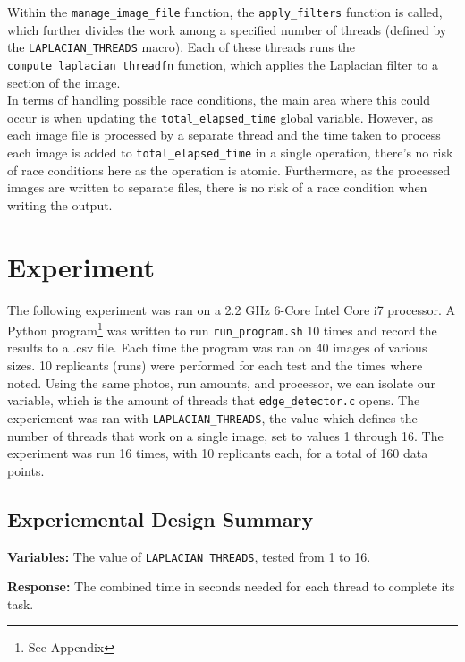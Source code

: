 \documentclass{article}
\begin{document}
Within the \texttt{manage\_image\_file} function,
the \texttt{apply\_filters} function is called,
which further divides the work among a specified number of threads
(defined by the \texttt{LAPLACIAN\_THREADS} macro).
Each of these threads runs the \texttt{compute\_laplacian\_threadfn} function,
which applies the Laplacian filter to a section of the image.\\

In terms of handling possible race conditions,
the main area where this could occur is when updating the \texttt{total\_elapsed\_time}
global variable. However, as each image file is processed
by a separate thread and the time taken to process each image is
added to \texttt{total\_elapsed\_time} in a single operation, there's no risk of
race conditions here as the operation is atomic.
Furthermore, as the processed images are written to separate files,
there is no risk of a race condition when writing the output.\\

\section*{Experiment}
The following experiment was ran on a 2.2 GHz 6-Core Intel Core i7 processor.
A Python program\footnote{See Appendix} was written to run \texttt{run\_program.sh} 10 times and record the results to a .csv file.
Each time the program was ran on 40 images of various sizes.
10 replicants (runs) were performed for each test and the times where noted.
Using the same photos, run amounts, and processor, we can isolate our variable, which is the amount of threads that \texttt{edge\_detector.c} opens.
The experiement was ran with \texttt{LAPLACIAN\_THREADS}, the value which defines the number of threads that work on a single image, set to values 1 through 16.
The experiment was run 16 times, with 10 replicants each, for a total of 160 data points.

\subsection*{Experiemental Design Summary}
\begin{flushleft}
  \textbf{Variables:} The value of \texttt{LAPLACIAN\_THREADS}, tested from 1 to 16. \\
\end{flushleft}

\begin{flushleft}
  \textbf{Response:} The combined time in seconds needed for each thread to complete its task. \\
\end{flushleft}
\end{document}
